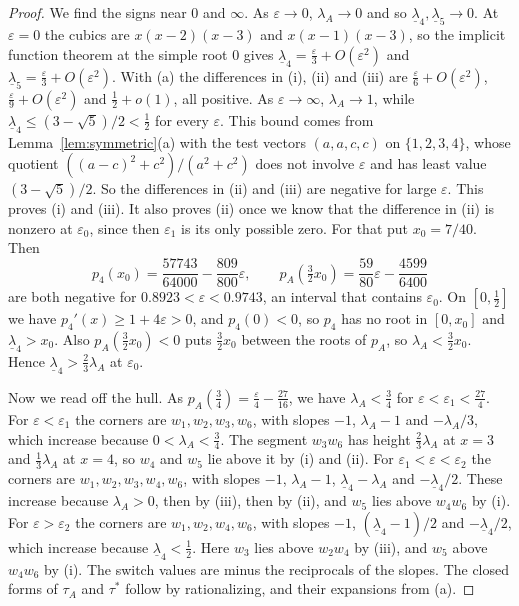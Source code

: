 \begin{proof}
We find the signs near $0$ and $\infty$. As $\varepsilon\to0$,
$\lambda_A\to0$ and so $\underline\lambda_4,\underline\lambda_5\to0$. At $\varepsilon=0$ the cubics are
$x(x-2)(x-3)$ and $x(x-1)(x-3)$, so the implicit function theorem at the simple
root $0$ gives $\underline\lambda_4=\frac\varepsilon3+O(\varepsilon^2)$ and
$\underline\lambda_5=\frac\varepsilon3+O(\varepsilon^2)$. With (a) the differences in (i),
(ii) and (iii) are $\frac\varepsilon6+O(\varepsilon^2)$,
$\frac\varepsilon9+O(\varepsilon^2)$ and $\frac12+o(1)$, all positive. As
$\varepsilon\to\infty$, $\lambda_A\to1$, while
$\underline\lambda_4\le(3-\sqrt5)/2<\frac12$ for every $\varepsilon$. This bound comes from
Lemma~\ref{lem:symmetric}(a) with the test vectors $(a,a,c,c)$ on
$\{1,2,3,4\}$, whose quotient $((a-c)^2+c^2)/(a^2+c^2)$ does not involve
$\varepsilon$ and has least value $(3-\sqrt5)/2$. So the differences in (ii) and
(iii) are negative for large $\varepsilon$. This proves (i) and (iii). It also
proves (ii) once we know that the difference in (ii) is nonzero at
$\varepsilon_0$, since then $\varepsilon_1$ is its only possible zero. For that
put $x_0=7/40$. Then
\[
p_4(x_0)=\frac{57743}{64000}-\frac{809}{800}\varepsilon,\qquad
p_A(\tfrac32x_0)=\frac{59}{80}\varepsilon-\frac{4599}{6400}
\]
are both negative for $0.8923<\varepsilon<0.9743$, an interval that contains
$\varepsilon_0$. On $[0,\frac12]$ we have $p_4'(x)\ge1+4\varepsilon>0$, and
$p_4(0)<0$, so $p_4$ has no root in $[0,x_0]$ and $\underline\lambda_4>x_0$. Also
$p_A(\frac32x_0)<0$ puts $\frac32x_0$ between the roots of $p_A$, so
$\lambda_A<\frac32x_0$. Hence $\underline\lambda_4>\frac23\lambda_A$ at $\varepsilon_0$.

Now we read off the hull. As $p_A(\frac34)=\frac\varepsilon4-\frac{27}{16}$, we
have $\lambda_A<\frac34$ for $\varepsilon<\varepsilon_1<\frac{27}4$. For
$\varepsilon<\varepsilon_1$ the corners are $w_1,w_2,w_3,w_6$, with slopes $-1$,
$\lambda_A-1$ and $-\lambda_A/3$, which increase because $0<\lambda_A<\frac34$.
The segment $w_3w_6$ has height $\frac23\lambda_A$ at $x=3$ and
$\frac13\lambda_A$ at $x=4$, so $w_4$ and $w_5$ lie above it by (i) and (ii).
For $\varepsilon_1<\varepsilon<\varepsilon_2$ the corners are
$w_1,w_2,w_3,w_4,w_6$, with slopes $-1$, $\lambda_A-1$, $\underline\lambda_4-\lambda_A$ and
$-\underline\lambda_4/2$. These increase because $\lambda_A>0$, then by (iii), then by (ii),
and $w_5$ lies above $w_4w_6$ by (i). For $\varepsilon>\varepsilon_2$ the corners
are $w_1,w_2,w_4,w_6$, with slopes $-1$, $(\underline\lambda_4-1)/2$ and $-\underline\lambda_4/2$, which
increase because $\underline\lambda_4<\frac12$. Here $w_3$ lies above $w_2w_4$ by (iii), and
$w_5$ above $w_4w_6$ by (i). The switch values are minus the reciprocals of the
slopes. The closed forms of $\tau_A$ and $\tau^*$ follow by rationalizing, and
their expansions from (a).
\end{proof}

